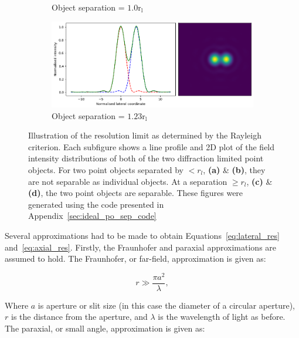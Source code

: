 \begin{figure}[h]
\begin{subfigure}{0.49\textwidth}
		\caption{Object separation = $1.0\text{r}_{\text{l}}$}
		\label{fig:Airy_ring_2_object_seperation_1_22}
	\end{subfigure}
	\begin{subfigure}{0.49\textwidth}
		\centering
		\includegraphics[width=\linewidth]{images/Airy_ring_2_object_seperation_1_5.png}
		\caption{Object separation = $1.23\text{r}_{\text{l}}$}
		\label{fig:Airy_ring_2_object_seperation_1_5}
	\end{subfigure}
	\caption[Illustration of the resolution limit as determined by the Rayleigh
	criterion]{Illustration of the resolution limit as determined by the Rayleigh 
		criterion. Each subfigure shows a line profile and 2D plot of the field 
		intensity distributions of both of the two diffraction limited point 
		objects. For two point objects separated by $< r_{l}$, \textbf{(a)} \& 
		\textbf{(b)}, they are not separable as individual objects. At a 
		separation $\ge r_{l}$, \textbf{(c)} \& \textbf{(d)}, the two point 
		objects are separable. These figures were generated using the 
		code presented in Appendix~\ref{sec:ideal_po_sep_code}}
	\label{fig:Airy_ring_2_object_seperation}
\end{figure}

Several approximations had to be made to obtain Equations~\ref{eq:lateral_res}
and~\ref{eq:axial_res}. Firstly, the Fraunhofer and paraxial approximations are assumed to hold\cite{goodman2005introduction}. The Fraunhofer, or far-field, approximation is given as\cite{lucke2006rayleigh}:

\begin{equation}\label{eq:fraunhofer}
r \gg \frac{\pi a^{2}}{\lambda},
\end{equation}

Where $a$ is aperture or slit size (in this case the diameter of a circular aperture), $r$ is the distance from the aperture, and $\lambda$ is the wavelength of light as before. The paraxial, or small angle, approximation is given as\cite{greivenkamp2004field}:

